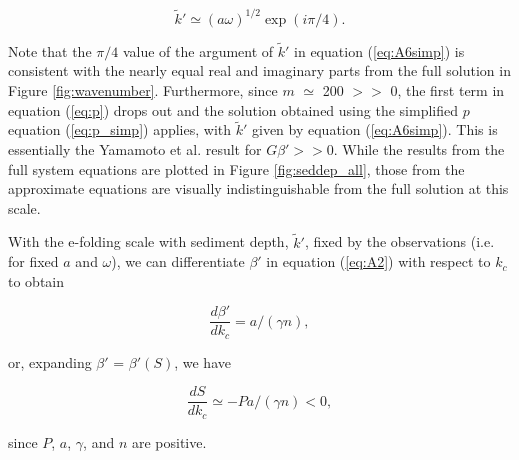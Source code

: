 \begin{equation}\label{eq:A6simp}
\tilde{k}' \simeq (a\omega)^{1/2}\exp(i\pi/4).
\end{equation}

\noindent Note that the $\pi/4$ value of the argument of $\tilde{k}'$ in equation (\ref{eq:A6simp}) is consistent with the nearly equal real and imaginary parts from the full solution in Figure \ref{fig:wavenumber}. Furthermore, since $m$ $\simeq$ 200 $>>$ 0, the first term in equation (\ref{eq:p}) drops out and the solution obtained using the simplified $p$ equation (\ref{eq:p_simp}) applies, with $\tilde{k}'$ given by equation (\ref{eq:A6simp}). This is essentially the Yamamoto et al. result for $G\beta'>>0$. While the results from the full system equations are plotted in Figure \ref{fig:seddep_all}, those from the approximate equations are visually indistinguishable from the full solution at this scale.

With the e-folding scale with sediment depth, $\tilde{k}'$, fixed by the observations (i.e. for fixed $a$ and $\omega$), we can differentiate $\beta'$ in equation (\ref{eq:A2}) with respect to $k_c$ to obtain

\begin{equation}\label{eq:A9}
\frac{d\beta'}{dk_c} = a/(\gamma n),
\end{equation}

\noindent or, expanding $\beta'$ = $\beta'(S)$, we have

\begin{equation}\label{eq:A10}
\frac{dS}{dk_c} \simeq -P a/(\gamma n) < 0,
\end{equation}

\noindent since $P$, $a$, $\gamma$, and $n$ are positive.


